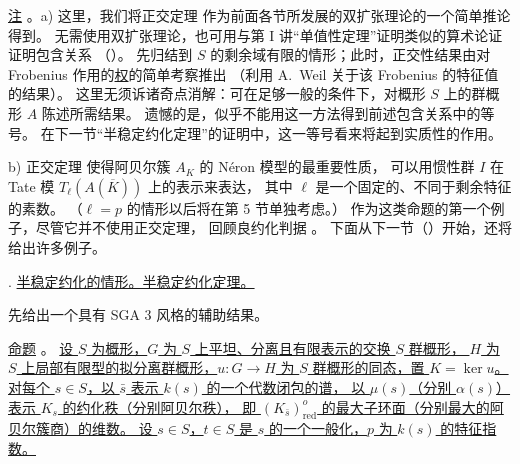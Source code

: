 \medskip
\noindent
\underline{注} 。\quad a)
这里，我们将正交定理  作为前面各节所发展的双扩张理论的一个简单推论得到。
无需使用双扩张理论，也可用与第 I 讲“单值性定理”证明类似的算术论证证明包含关系
（）。
先归结到 $S$ 的剩余域有限的情形；此时，正交性结果由对 Frobenius 作用的\underline{权}的简单考察推出
（利用 A.~Weil 关于该 Frobenius 的特征值的结果）。
这里无须诉诸奇点消解：可在足够一般的条件下，对概形 $S$ 上的群概形 $A$ 陈述所需结果。
遗憾的是，似乎不能用这一方法得到前述包含关系中的等号。
在下一节“半稳定约化定理”的证明中，这一等号看来将起到实质性的作用。

\smallskip
\noindent
b) 正交定理  使得阿贝尔簇 $A_K$ 的 N\'eron 模型的最重要性质，
可以用惯性群 $I$ 在 Tate 模 $T_\ell(A(\overline K))$ 上的表示来表达，
其中 $\ell$ 是一个固定的、不同于剩余特征的素数。
（$\ell=p$ 的情形以后将在第 5 节单独考虑。）
作为这类命题的第一个例子，尽管它并不使用正交定理，
回顾良约化判据 。
下面从下一节（）开始，还将给出许多例子。



\medskip
{}. \underline{半稳定约化的情形。半稳定约化定理。}

先给出一个具有 SGA 3 风格的辅助结果。

\medskip
\noindent
\underline{命题} 。
\underline{设 $S$ 为概形，$G$ 为 $S$ 上平坦、分离且有限表示的交换 $S$ 群概形，
$H$ 为 $S$ 上局部有限型的拟分离群概形，$u:G\longrightarrow H$ 为 $S$ 群概形的同态，置 $K=\ker u$。
对每个 $s\in S$，以 $\bar s$ 表示 $k(s)$ 的一个代数闭包的谱，
以 $\mu(s)$（分别 $\alpha(s)$）表示 $K_s$ 的约化秩（分别阿贝尔秩），
即 $(K_{\bar s})^o_{\mathrm{red}}$ 的最大子环面（分别最大的阿贝尔簇商）的维数。
设 $s\in S$，$t\in S$ 是 $s$ 的一个一般化，$p$ 为 $k(s)$ 的特征指数。}

